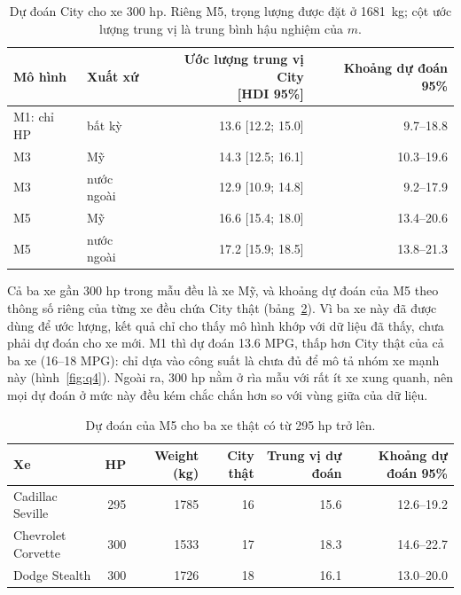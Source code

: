 \documentclass[12pt,a4paper]{report}
\begin{document}
\begin{table}[tp]
  \centering
  \caption{Dự đoán City cho xe 300 hp. Riêng M5, trọng lượng được đặt ở
    \SI{1681}{kg}; cột ước lượng trung vị là trung bình hậu nghiệm của $m$.}
  \label{tab:q4}
  \begin{tabular}{llrr}
    \toprule
    Mô hình & Xuất xứ & \shortstack{Ước lượng trung vị City\\{[HDI 95\%]}} & Khoảng dự đoán 95\% \\
    \midrule
    M1: chỉ HP & bất kỳ      & \num{13.6} [\num{12.2}; \num{15.0}] & \num{9.7}--\num{18.8} \\
    M3         & Mỹ          & \num{14.3} [\num{12.5}; \num{16.1}] & \num{10.3}--\num{19.6} \\
    M3         & nước ngoài  & \num{12.9} [\num{10.9}; \num{14.8}] & \num{9.2}--\num{17.9} \\
    M5         & Mỹ          & \num{16.6} [\num{15.4}; \num{18.0}] & \num{13.4}--\num{20.6} \\
    M5         & nước ngoài  & \num{17.2} [\num{15.9}; \num{18.5}] & \num{13.8}--\num{21.3} \\
    \bottomrule
  \end{tabular}
\end{table}

Cả ba xe gần 300 hp trong mẫu đều là xe Mỹ, và khoảng dự đoán của M5 theo thông
số riêng của từng xe đều chứa City thật (bảng~\ref{tab:q4-real}). Vì ba xe này
đã được dùng để ước lượng, kết quả chỉ cho thấy mô hình khớp với dữ liệu đã
thấy, chưa phải dự đoán cho xe mới. M1 thì dự đoán \num{13.6} MPG, thấp hơn City thật
của cả ba xe (16--18 MPG): chỉ dựa vào công suất là chưa đủ để mô tả nhóm xe
mạnh này (hình~\ref{fig:q4}). Ngoài ra, 300 hp nằm ở rìa mẫu với rất ít xe xung
quanh, nên mọi dự đoán ở mức này đều kém chắc chắn hơn so với vùng giữa của dữ
liệu.

\begin{table}[tp]
  \centering
  \caption{Dự đoán của M5 cho ba xe thật có từ 295 hp trở lên.}
  \label{tab:q4-real}
  \begin{tabular}{lrrrrr}
    \toprule
    Xe & HP & Weight (kg) & City thật & Trung vị dự đoán & Khoảng dự đoán 95\% \\
    \midrule
    Cadillac Seville   & 295 & \num{1785} & 16 & \num{15.6} & \num{12.6}--\num{19.2} \\
    Chevrolet Corvette & 300 & \num{1533} & 17 & \num{18.3} & \num{14.6}--\num{22.7} \\
    Dodge Stealth      & 300 & \num{1726} & 18 & \num{16.1} & \num{13.0}--\num{20.0} \\
    \bottomrule
  \end{tabular}
\end{table}
\end{document}
